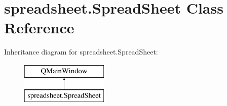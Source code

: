 \hypertarget{classspreadsheet_1_1SpreadSheet}{}\section{spreadsheet.\+Spread\+Sheet Class Reference}
\label{classspreadsheet_1_1SpreadSheet}
Inheritance diagram for spreadsheet.\+Spread\+Sheet\+:\begin{figure}[H]
\begin{center}
\leavevmode
\includegraphics[height=2.000000cm]{classspreadsheet_1_1SpreadSheet}
\end{center}
\end{figure}
